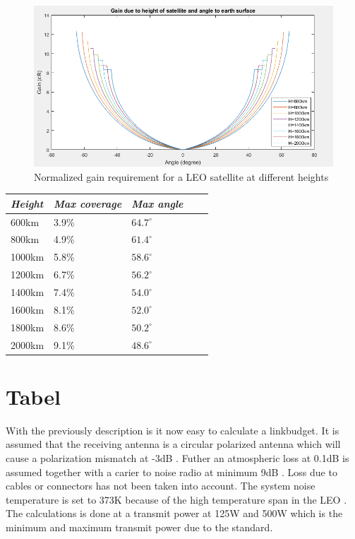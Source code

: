 \begin{figure}[H]
\centering 
\includegraphics[scale = 0.7]{figures/linkbudget/sat_farfield_matlab.png}
\caption{Normalized gain requirement for a LEO satellite at different heights}
\label{fig:sat_farfield_plot}
\end{figure} 

\begin{center}
 \label{tab:scaling}
  \begin{tabular}{ l  l  l  l  l}
    \hline
   \textit{Height} & \textit{Max coverage} & \textit{Max angle} \\ \hline
    600km & 3.9\%	& $64.7^\circ$   \\ \hline
    800km & 4.9\%	& $61.4^\circ$   \\ \hline
    1000km & 5.8\%	& $58.6^\circ$   \\ \hline
    1200km & 6.7\%	& $56.2^\circ$   \\ \hline
    1400km & 7.4\%	& $54.0^\circ$   \\ \hline
    1600km & 8.1\%	& $52.0^\circ$   \\ \hline
    1800km & 8.6\%	& $50.2^\circ$   \\ \hline
    2000km & 9.1\%	& $48.6^\circ$   \\ \hline
\end{tabular}
\end{center}

\section{Tabel}
With the previously description is it now easy to calculate a linkbudget. It is assumed that the receiving antenna is a circular polarized antenna which will cause a polarization mismatch at -3dB \citep{Balanis2005}. Futher an atmospheric loss at 0.1dB is assumed together with a carier to noise radio at minimum 9dB \citep{itu2017}. Loss due to cables or connectors has not been taken into account. The system noise temperature is set to 373K because of the high temperature span in the LEO \citep{FlyingLab}. The calculations is done at a transmit power at 125W and 500W which is the minimum and maximum transmit power due to the standard.   
 
